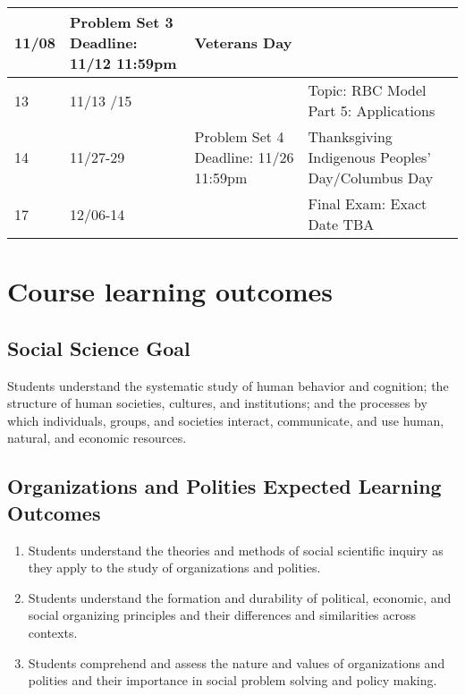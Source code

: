\documentclass[12pt]{article}
\begin{document}
\begin{tabular}{|p{\bb}|p{\qq}|p{\rr}|p{\pp}|}
        11/08
        &
        Problem Set 3
        \newline
        Deadline: 11/12 11:59pm
        &
        Veterans Day
    \\
    \hline
        13
        &
        11/13
        \newline
        11/15
        &
        &
        Topic: RBC Model Part 5: Applications
    \\
    \hline
        14
        &
        11/27-29
        &
        Problem Set 4
        \newline
        Deadline: 11/26 11:59pm
        &
        Thanksgiving
        \newline
        Indigenous Peoples' Day/Columbus Day
    \\
    \hline
        17
        &
        12/06-14
        &
        &
        Final Exam: Exact Date TBA
    \\
    \hline
\end{tabular}


\newpage

\section*{Course learning outcomes}


\subsection*{Social Science Goal}

Students understand the systematic study of human behavior and cognition; the structure of human societies, cultures, and institutions; and the processes by which individuals, groups, and societies interact, communicate, and use human, natural, and economic resources.

\subsection*{Organizations and Polities Expected Learning Outcomes}
\begin{enumerate}
    \item Students understand the theories and methods of social scientific inquiry as they apply to the study of organizations and polities.
    \item Students understand the formation and durability of political, economic, and social organizing principles and their differences and similarities across contexts.
    \item Students comprehend and assess the nature and values of organizations and polities and their importance in social problem solving and policy making.
\end{enumerate}
\end{document}
